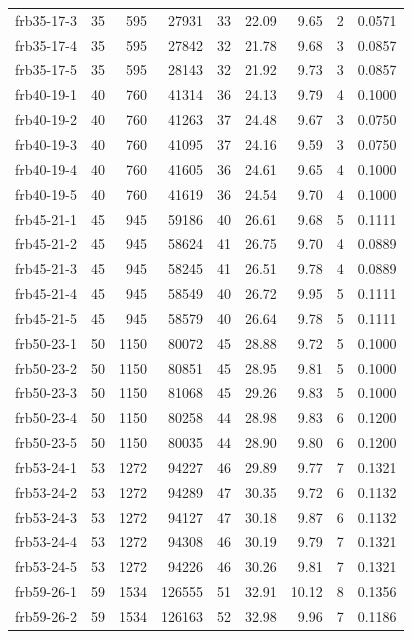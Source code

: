\begin{longtable}{llrrrrrll}
frb35-17-3 & 35 & 595 & 27931 & 33 & 22.09 & 9.65 & 2 & 0.0571 \\
frb35-17-4 & 35 & 595 & 27842 & 32 & 21.78 & 9.68 & 3 & 0.0857 \\
frb35-17-5 & 35 & 595 & 28143 & 32 & 21.92 & 9.73 & 3 & 0.0857 \\
frb40-19-1 & 40 & 760 & 41314 & 36 & 24.13 & 9.79 & 4 & 0.1000 \\
frb40-19-2 & 40 & 760 & 41263 & 37 & 24.48 & 9.67 & 3 & 0.0750 \\
frb40-19-3 & 40 & 760 & 41095 & 37 & 24.16 & 9.59 & 3 & 0.0750 \\
frb40-19-4 & 40 & 760 & 41605 & 36 & 24.61 & 9.65 & 4 & 0.1000 \\
frb40-19-5 & 40 & 760 & 41619 & 36 & 24.54 & 9.70 & 4 & 0.1000 \\
frb45-21-1 & 45 & 945 & 59186 & 40 & 26.61 & 9.68 & 5 & 0.1111 \\
frb45-21-2 & 45 & 945 & 58624 & 41 & 26.75 & 9.70 & 4 & 0.0889 \\
frb45-21-3 & 45 & 945 & 58245 & 41 & 26.51 & 9.78 & 4 & 0.0889 \\
frb45-21-4 & 45 & 945 & 58549 & 40 & 26.72 & 9.95 & 5 & 0.1111 \\
frb45-21-5 & 45 & 945 & 58579 & 40 & 26.64 & 9.78 & 5 & 0.1111 \\
frb50-23-1 & 50 & 1150 & 80072 & 45 & 28.88 & 9.72 & 5 & 0.1000 \\
frb50-23-2 & 50 & 1150 & 80851 & 45 & 28.95 & 9.81 & 5 & 0.1000 \\
frb50-23-3 & 50 & 1150 & 81068 & 45 & 29.26 & 9.83 & 5 & 0.1000 \\
frb50-23-4 & 50 & 1150 & 80258 & 44 & 28.98 & 9.83 & 6 & 0.1200 \\
frb50-23-5 & 50 & 1150 & 80035 & 44 & 28.90 & 9.80 & 6 & 0.1200 \\
frb53-24-1 & 53 & 1272 & 94227 & 46 & 29.89 & 9.77 & 7 & 0.1321 \\
frb53-24-2 & 53 & 1272 & 94289 & 47 & 30.35 & 9.72 & 6 & 0.1132 \\
frb53-24-3 & 53 & 1272 & 94127 & 47 & 30.18 & 9.87 & 6 & 0.1132 \\
frb53-24-4 & 53 & 1272 & 94308 & 46 & 30.19 & 9.79 & 7 & 0.1321 \\
frb53-24-5 & 53 & 1272 & 94226 & 46 & 30.26 & 9.81 & 7 & 0.1321 \\
frb59-26-1 & 59 & 1534 & 126555 & 51 & 32.91 & 10.12 & 8 & 0.1356 \\
frb59-26-2 & 59 & 1534 & 126163 & 52 & 32.98 & 9.96 & 7 & 0.1186 \\

\end{longtable}
